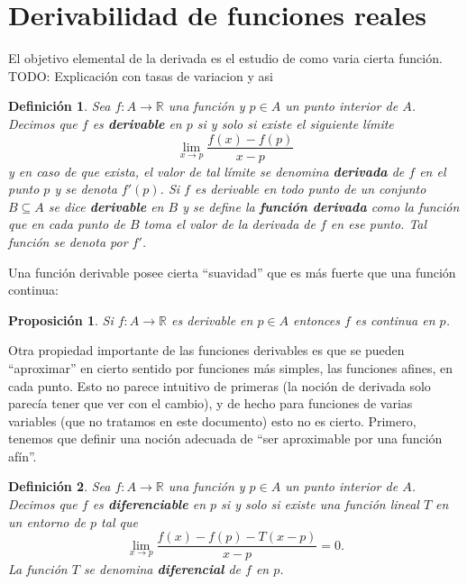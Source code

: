 \documentclass{article}
\newtheorem{prop}{Proposición}
\newtheorem{define}{Definición}
\newcommand{\reales}{\mathbb{R}}
\begin{document}
\newpage
\section{Derivabilidad de funciones reales}
El objetivo elemental de la derivada es el estudio de como varia cierta función. TODO: Explicación con tasas de variacion y asi

\begin{define}
	Sea $f: A \rightarrow \reales$ una función y $p \in A$ un punto interior de $A$. Decimos que $f$ es \textbf{derivable} en $p$ si y solo si existe el siguiente límite
	\begin{equation*}
		\lim_{x \rightarrow p} \frac{f(x) - f(p)}{x - p}
	\end{equation*}
	y en caso de que exista, el valor de tal límite se denomina \textbf{derivada} de $f$ en el punto $p$ y se denota $f'(p)$. Si $f$ es derivable en todo punto de un conjunto $B \subseteq A$ se dice \textbf{derivable} en $B$ y se define la \textbf{función derivada} como la función que en cada punto de $B$ toma el valor de la derivada de $f$ en ese punto. Tal función se denota por $f'$. 
\end{define}

Una función derivable posee cierta ``suavidad'' que es más fuerte que una función continua:

\begin{prop}
	Si $f: A \rightarrow \reales$ es derivable en $p \in A$ entonces $f$ es continua en $p$.
\end{prop}

Otra propiedad importante de las funciones derivables es que se pueden ``aproximar'' en cierto sentido por funciones más simples, las funciones afines, en cada punto. Esto no parece intuitivo de primeras (la noción de derivada solo parecía tener que ver con el cambio), y de hecho para funciones de varias variables (que no tratamos en este documento) esto no es cierto. Primero, tenemos que definir una noción adecuada de ``ser aproximable por una función afín''.

\begin{define}
	Sea $f: A \rightarrow \reales$ una función y $p \in A$ un punto interior de $A$. Decimos que $f$ es \textbf{diferenciable} en $p$ si y solo si existe una función lineal $T$ en un entorno de $p$ tal que
	\begin{equation*}
		\lim_{x \rightarrow p} \frac{f(x) - f(p) - T(x-p)}{x-p} = 0.
	\end{equation*}
	La función $T$ se denomina \textbf{diferencial} de $f$ en $p$.
\end{define}
\end{document}
